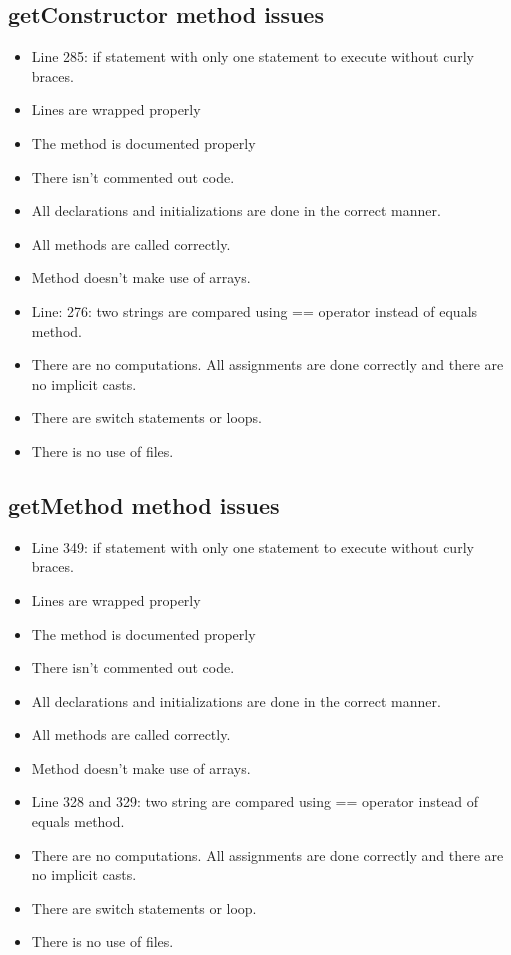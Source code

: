\subsection{getConstructor method issues}
\begin{itemize}
	\item Line 285: if statement with only one statement to execute without curly braces.
	\item Lines are wrapped properly
	\item The method is documented properly
	\item There isn't commented out code.
	\item All declarations and initializations are done in the correct manner.
	\item All methods are called correctly.
	\item Method doesn't make use of arrays.
	\item Line: 276: two strings are compared using == operator instead of equals method.
	\item There are no computations. All assignments are done correctly and there are no implicit casts.
	\item There are switch statements or loops.
	\item There is no use of files.
\end{itemize}

\subsection{getMethod method issues}
\begin{itemize}
	\item Line 349: if statement with only one statement to execute without curly braces.
	\item Lines are wrapped properly
	\item The method is documented properly
	\item There isn't commented out code.
	\item All declarations and initializations are done in the correct manner.
	\item All methods are called correctly.
	\item Method doesn't make use of arrays.
	\item Line 328 and 329: two string are compared using  == operator instead of equals method.
	\item There are no computations. All assignments are done correctly and there are no implicit casts.
	\item There are switch statements or loop.
	\item There is no use of files.
\end{itemize}

